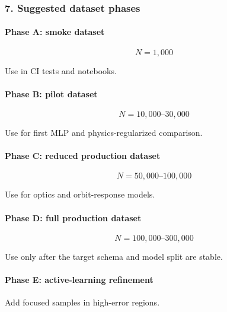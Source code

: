 \documentclass[
]{article}
\begin{document}
\hypertarget{suggested-dataset-phases}{%
\subsubsection{7. Suggested dataset
phases}\label{suggested-dataset-phases}}

\hypertarget{phase-a-smoke-dataset}{%
\paragraph{Phase A: smoke dataset}\label{phase-a-smoke-dataset}}

\[
N=1{,}000
\]

Use in CI tests and notebooks.

\hypertarget{phase-b-pilot-dataset}{%
\paragraph{Phase B: pilot dataset}\label{phase-b-pilot-dataset}}

\[
N=10{,}000\text{--}30{,}000
\]

Use for first MLP and physics-regularized comparison.

\hypertarget{phase-c-reduced-production-dataset}{%
\paragraph{Phase C: reduced production
dataset}\label{phase-c-reduced-production-dataset}}

\[
N=50{,}000\text{--}100{,}000
\]

Use for optics and orbit-response models.

\hypertarget{phase-d-full-production-dataset}{%
\paragraph{Phase D: full production
dataset}\label{phase-d-full-production-dataset}}

\[
N=100{,}000\text{--}300{,}000
\]

Use only after the target schema and model split are stable.

\hypertarget{phase-e-active-learning-refinement}{%
\paragraph{Phase E: active-learning
refinement}\label{phase-e-active-learning-refinement}}

Add focused samples in high-error regions.
\end{document}
